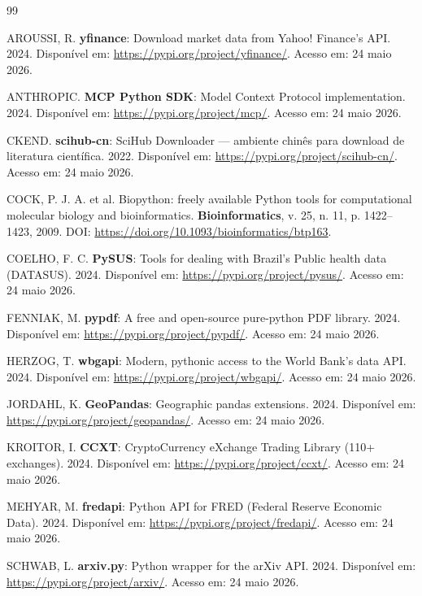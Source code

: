 \documentclass[12pt,a4paper]{article}
\begin{document}
\begin{thebibliography}{99}

AROUSSI, R. \textbf{yfinance}: Download market data from Yahoo! Finance's API. 2024.
Disponível em: \url{https://pypi.org/project/yfinance/}. Acesso em: 24 maio 2026.

ANTHROPIC. \textbf{MCP Python SDK}: Model Context Protocol implementation. 2024.
Disponível em: \url{https://pypi.org/project/mcp/}. Acesso em: 24 maio 2026.

CKEND. \textbf{scihub-cn}: SciHub Downloader — ambiente chinês para download de literatura científica. 2022.
Disponível em: \url{https://pypi.org/project/scihub-cn/}. Acesso em: 24 maio 2026.

COCK, P. J. A. et al. Biopython: freely available Python tools for computational molecular biology and bioinformatics. \textbf{Bioinformatics}, v. 25, n. 11, p. 1422–1423, 2009.
DOI: \url{https://doi.org/10.1093/bioinformatics/btp163}.

COELHO, F. C. \textbf{PySUS}: Tools for dealing with Brazil's Public health data (DATASUS). 2024.
Disponível em: \url{https://pypi.org/project/pysus/}. Acesso em: 24 maio 2026.

FENNIAK, M. \textbf{pypdf}: A free and open-source pure-python PDF library. 2024.
Disponível em: \url{https://pypi.org/project/pypdf/}. Acesso em: 24 maio 2026.

HERZOG, T. \textbf{wbgapi}: Modern, pythonic access to the World Bank's data API. 2024.
Disponível em: \url{https://pypi.org/project/wbgapi/}. Acesso em: 24 maio 2026.

JORDAHL, K. \textbf{GeoPandas}: Geographic pandas extensions. 2024.
Disponível em: \url{https://pypi.org/project/geopandas/}. Acesso em: 24 maio 2026.

KROITOR, I. \textbf{CCXT}: CryptoCurrency eXchange Trading Library (110+ exchanges). 2024.
Disponível em: \url{https://pypi.org/project/ccxt/}. Acesso em: 24 maio 2026.

MEHYAR, M. \textbf{fredapi}: Python API for FRED (Federal Reserve Economic Data). 2024.
Disponível em: \url{https://pypi.org/project/fredapi/}. Acesso em: 24 maio 2026.

SCHWAB, L. \textbf{arxiv.py}: Python wrapper for the arXiv API. 2024.
Disponível em: \url{https://pypi.org/project/arxiv/}. Acesso em: 24 maio 2026.


\end{thebibliography}
\end{document}
